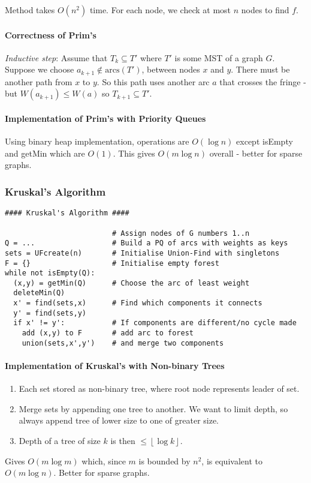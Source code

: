 \documentclass[twocolumn,english]{article}
\begin{document}
Method takes $O\left(n^{2}\right)$ time. For each node, we check
at most $n$ nodes to find $f$.


\paragraph{Correctness of Prim's}

\emph{Inductive step}: Assume that $T_{k}\subseteq T'$ where $T'$
is some MST of a graph $G$. Suppose we choose $a_{k+1}\notin\mbox{arcs}\left(T'\right)$,
between nodes $x$ and $y$. There must be another path from $x$
to $y$. So this path uses another arc $a$ that crosses the fringe
- but $W\left(a_{k+1}\right)\leq W\left(a\right)$ so $T_{k+1}\subseteq T'$.


\paragraph{Implementation of Prim's with Priority Queues}

Using binary heap implementation, operations are $O\left(\log n\right)$
except isEmpty and getMin which are $O\left(1\right)$. This gives
$O\left(m\log n\right)$ overall - better for sparse graphs.


\subsubsection{Kruskal's Algorithm}

\begin{lstlisting}[basicstyle={\footnotesize\ttfamily},showstringspaces=false]
#### Kruskal's Algorithm ####

                         # Assign nodes of G numbers 1..n
Q = ...                  # Build a PQ of arcs with weights as keys
sets = UFcreate(n)       # Initialise Union-Find with singletons
F = {}                   # Initialise empty forest
while not isEmpty(Q):
  (x,y) = getMin(Q)      # Choose the arc of least weight
  deleteMin(Q)
  x' = find(sets,x)      # Find which components it connects
  y' = find(sets,y)
  if x' != y':           # If components are different/no cycle made
    add (x,y) to F       # add arc to forest
    union(sets,x',y')    # and merge two components
\end{lstlisting}



\paragraph{Implementation of Kruskal's with Non-binary Trees}
\begin{enumerate}
\item Each set stored as non-binary tree, where root node represents leader
of set.
\item Merge sets by appending one tree to another. We want to limit depth,
so always append tree of lower size to one of greater size.
\item Depth of a tree of size $k$ is then $\leq\left\lfloor \log k\right\rfloor $.
\end{enumerate}
Gives $O\left(m\log m\right)$ which, since $m$ is bounded by $n^{2}$,
is equivalent to $O\left(m\log n\right)$. Better for sparse graphs.
\end{document}
